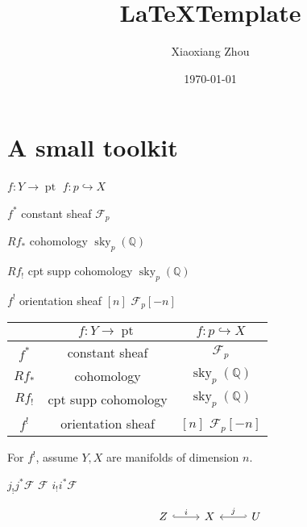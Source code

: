 \documentclass[UTF8]{amsart}
\numberwithin{equation}{section}
\theoremstyle{plain}
\numberwithin{equation}{section}
\theoremstyle{remark}
\DeclareMathOperator{\pt}{\operatorname{pt}}	%
\DeclareMathOperator{\sky}{\operatorname{sky}}
\begin{document}
\date{\today}

\title
{\LaTeX\;Template
}
\author{Xiaoxiang Zhou}
\address{School of Mathematical Sciences\\
University of Bonn\\
Bonn, 53115\\ Germany\\} 


\maketitle
\tableofcontents


\section{A small toolkit}

$f:Y \longrightarrow \pt$ $f: p \hookrightarrow X$

$f^*$ constant sheaf $\mathcal{F}_p$

$Rf_*$ cohomology $\sky_p(\mathbb{Q})$

$Rf_!$ cpt supp cohomology $\sky_p(\mathbb{Q})$

$f^!$ orientation sheaf $[n]$ $\mathcal{F}_p[-n]$

\begin{table}[]
\centering
\begin{tabular}{c|c|c}
\hline
 & $f:Y \longrightarrow \pt$ & $f: p \hookrightarrow X$ \\ \hline
$f^*$ & constant sheaf & $\mathcal{F}_p$ \\ \hline
$Rf_*$ & cohomology & $\sky_p(\mathbb{Q})$ \\ \hline
$Rf_!$ & cpt supp cohomology & $\sky_p(\mathbb{Q})$ \\ \hline
$f^!$ & orientation sheaf & $[n]$ $\mathcal{F}_p[-n]$ \\ \hline
\end{tabular}
\end{table}

For $f^!$, assume $Y,X$ are manifolds of dimension $n$.

$j_!j^* \mathcal{F}$ $\mathcal{F}$ $i_!i^*\mathcal{F}$

\[\begin{tikzcd}
	Z & X & U
	\arrow["i", hook, from=1-1, to=1-2]
	\arrow["j"', hook', from=1-3, to=1-2]
\end{tikzcd}\]
\end{document}
